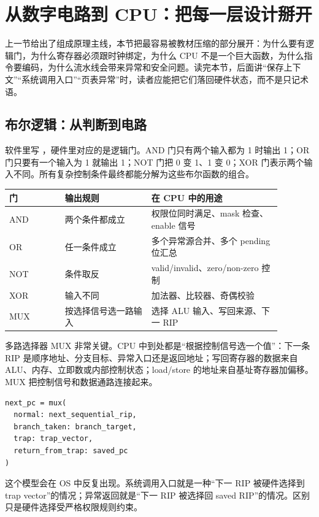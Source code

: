 \section{从数字电路到 CPU：把每一层设计掰开}

上一节给出了组成原理主线，本节把最容易被教材压缩的部分展开：为什么要有逻辑门，为什么寄存器必须跟时钟绑定，为什么 CPU 不是一个巨大函数，为什么指令要编码，为什么流水线会带来异常和安全问题。读完本节，后面讲“保存上下文”“系统调用入口”“页表异常”时，读者应能把它们落回硬件状态，而不是只记术语。

\subsection{布尔逻辑：从判断到电路}

软件里写 ，硬件里对应的是逻辑门。AND 门只有两个输入都为 1 时输出 1；OR 门只要有一个输入为 1 就输出 1；NOT 门把 0 变 1、1 变 0；XOR 门表示两个输入不同。所有复杂控制条件最终都能分解为这些布尔函数的组合。

\begin{longtable}{p{0.18\linewidth}p{0.28\linewidth}p{0.42\linewidth}}
\toprule
门 & 输出规则 & 在 CPU 中的用途 \\
\midrule
AND & 两个条件都成立 & 权限位同时满足、mask 检查、enable 信号 \\
OR & 任一条件成立 & 多个异常源合并、多个 pending 位汇总 \\
NOT & 条件取反 & valid/invalid、zero/non-zero 控制 \\
XOR & 输入不同 & 加法器、比较器、奇偶校验 \\
MUX & 按选择信号选一路输入 & 选择 ALU 输入、写回来源、下一 RIP \\
\bottomrule
\end{longtable}

多路选择器 MUX 非常关键。CPU 中到处都是“根据控制信号选一个值”：下一条 RIP 是顺序地址、分支目标、异常入口还是返回地址；写回寄存器的数据来自 ALU、内存、立即数或内部控制状态；load/store 的地址来自基址寄存器加偏移。MUX 把控制信号和数据通路连接起来。

\begin{lstlisting}
next_pc = mux(
  normal: next_sequential_rip,
  branch_taken: branch_target,
  trap: trap_vector,
  return_from_trap: saved_pc
)
\end{lstlisting}

这个模型会在 OS 中反复出现。系统调用入口就是一种“下一 RIP 被硬件选择到 trap vector”的情况；异常返回就是“下一 RIP 被选择回 saved RIP”的情况。区别只是硬件选择受严格权限规则约束。

